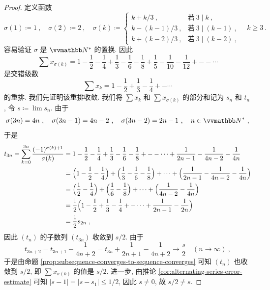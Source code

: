 \begin{proof}
    定义函数
    \[
        \sigma(1) \coloneqq 1\ ,\quad \sigma(2) \coloneqq 2\ ,\quad \sigma(k) \coloneqq
        \begin{cases}
            k + k / 3\ ,       & \text{若}\ 3 \mid k\ , \\
            k - (k - 1) / 3\ , & \text{若}\ 3 \mid (k - 1)\ , \\
            k + (k - 2) / 3\ , & \text{若}\ 3 \mid (k - 2)\ ,
        \end{cases}
        \quad k \geq 3\ .
    \]
    容易验证 \(\sigma\) 是 \(\N^\ast\) 的置换. 因此
    \[
        \sum x_{\sigma(k)} = 1 - \frac{1}{2} - \frac{1}{4} + \frac{1}{3} - \frac{1}{6} - \frac{1}{8} + \frac{1}{5} - \frac{1}{10} - \frac{1}{12} + - - \cdots
    \]
    是交错级数
    \[
        \sum x_k = 1 - \frac{1}{2} + \frac{1}{3} - \frac{1}{4} + - \cdots
    \]
    的重排. 我们先证明该重排收敛. 我们将 \(\sum x_k\) 和 \(\sum x_{\sigma(k)}\) 的部分和记为 \(s_n\) 和 \(t_n\), 令 \(s \coloneqq \lim s_n\). 由于
    \[
        \sigma(3 n) = 4 n\ ,\quad \sigma(3 n - 1) = 4 n - 2\ ,\quad \sigma(3 n - 2) = 2 n - 1\ ,\quad n \in \N^\ast\ ,
    \]
    于是
    \begin{align*}
        t_{3 n} = \sum_{k = 0}^{3 n} \frac{(- 1)^{\sigma(k) + 1}}{\sigma(k)} &= 1 - \frac{1}{2} - \frac{1}{4} + \frac{1}{3} - \frac{1}{6} - \frac{1}{8} + - - \cdots + \frac{1}{2 n - 1} - \frac{1}{4 n - 2} - \frac{1}{4 n}\\
        &= \Bigl(1 - \frac{1}{2} - \frac{1}{4}\Bigr) + \Bigl(\frac{1}{3} - \frac{1}{6} - \frac{1}{8}\Bigr) + \cdots + \Bigl(\frac{1}{2 n - 1} - \frac{1}{4 n - 2} - \frac{1}{4 n}\Bigr)\\
        &= \Bigl(\frac{1}{2} - \frac{1}{4}\Bigr) + \Bigl(\frac{1}{6} - \frac{1}{8}\Bigr) + \cdots + \Bigl(\frac{1}{4 n - 2} - \frac{1}{4 n}\Bigr)\\
        &= \frac{1}{2} \Bigl(1 - \frac{1}{2} + \frac{1}{3} - \frac{1}{4} + - \cdots + \frac{1}{2 n - 1} - \frac{1}{2 n}\Bigr)\\
        &= \frac{1}{2} s_{2 n}\ ,
    \end{align*}
    因此 \((t_n)\) 的子数列 \((t_{3 n})\) 收敛到 \(s / 2\). 由于
    \[
        t_{3 n + 2} = t_{3 n + 1} - \frac{1}{4 n + 2} = t_{3 n} + \frac{1}{2 n + 1} - \frac{1}{4 n + 2} \to \frac{s}{2}\quad (n \to \infty)\ ,
    \]
    于是由命题 \ref{prop:subsequence-converges-to-sequence-converges} 可知 \((t_n)\) 也收敛到 \(s / 2\), 即 \(\sum x_{\sigma(k)}\) 的值是 \(s / 2\). 进一步, 由推论 \ref{cor:alternating-series-error-estimate} 可知 \(|s - 1| = |s - s_1| \leq 1 / 2\), 因此 \(s \neq 0\), 故 \(s / 2 \neq s\).
\end{proof}

